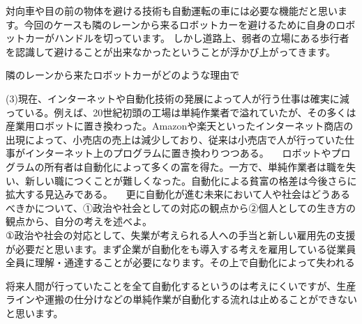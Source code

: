 \documentclass[11pt,a4paper]{jsarticle}
\begin{document}
対向車や目の前の物体を避ける技術も自動運転の車には必要な機能だと思います。今回のケースも隣のレーンから来るロボットカーを避けるために自身のロボットカーがハンドルを切っています。
しかし道路上、弱者の立場にある歩行者を認識して避けることが出来なかったということが浮かび上がってきます。

隣のレーンから来たロボットカーがどのような理由で

\newpage
 (3)現在、インターネットや自動化技術の発展によって人が行う仕事は確実に減っている。例えば、20世紀初頭の工場は単純作業者で溢れていたが、その多くは産業用ロボットに置き換わった。Amazonや楽天といったインターネット商店の出現によって、小売店の売上は減少しており、従来は小売店で人が行っていた仕事がインターネット上のプログラムに置き換わりつつある。
　ロボットやプログラムの所有者は自動化によって多くの富を得た。一方で、単純作業者は職を失い、新しい職につくことが難しくなった。自動化による貧富の格差は今後さらに拡大する見込みである。
　更に自動化が進む未来において人や社会はどうあるべきかについて、①政治や社会としての対応の観点から②個人としての生き方の観点から、自分の考えを述べよ。\\
 
①政治や社会の対応として、失業が考えられる人への手当と新しい雇用先の支援が必要だと思います。まず企業が自動化をも導入する考えを雇用している従業員全員に理解・通達することが必要になります。その上で自動化によって失われる

将来人間が行っていたことを全て自動化するというのは考えにくいですが、生産ラインや運搬の仕分けなどの単純作業が自動化する流れは止めることができないと思います。
\end{document}
